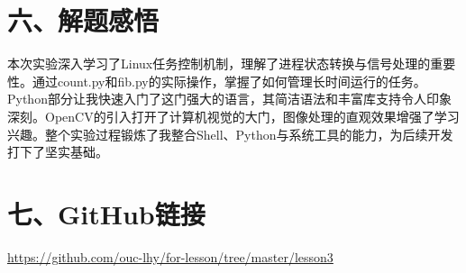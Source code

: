 \documentclass[a4paper, 12pt]{article}
\begin{document}
\section*{六、解题感悟}
本次实验深入学习了Linux任务控制机制，理解了进程状态转换与信号处理的重要性。通过count.py和fib.py的实际操作，掌握了如何管理长时间运行的任务。Python部分让我快速入门了这门强大的语言，其简洁语法和丰富库支持令人印象深刻。OpenCV的引入打开了计算机视觉的大门，图像处理的直观效果增强了学习兴趣。整个实验过程锻炼了我整合Shell、Python与系统工具的能力，为后续开发打下了坚实基础。

\section*{七、GitHub链接}
\url{https://github.com/ouc-lhy/for-lesson/tree/master/lesson3}
\end{document}
